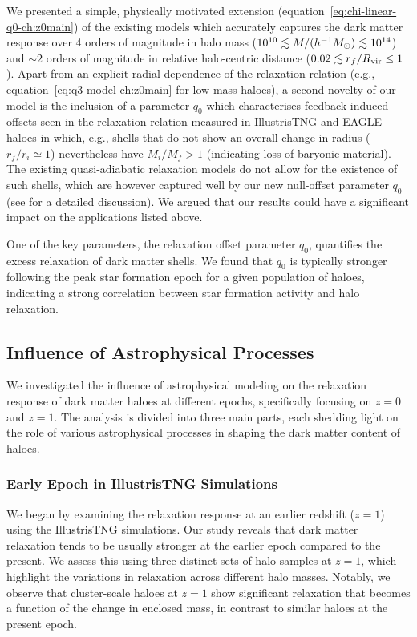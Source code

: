 We presented a simple, physically motivated extension (equation~\ref{eq:chi-linear-q0-ch:z0main}) of the existing models which accurately captures the dark matter response over 4 orders of magnitude in halo mass ($10^{10}\lesssim M/(h^{-1}M_{\odot})\lesssim 10^{14}$) and $\sim2$ orders of magnitude in relative halo-centric distance ($0.02\lesssim r_f/R_{\rm vir}\leq1$). Apart from an explicit radial dependence of the relaxation relation (e.g., equation~\ref{eq:q3-model-ch:z0main} for low-mass haloes), a second novelty of our model is the inclusion of a parameter $q_0$ which characterises feedback-induced offsets seen in the relaxation relation measured in IllustrisTNG and EAGLE haloes in which, e.g., shells that do not show an overall change in radius ($r_f/r_i\simeq1$) nevertheless have $M_i/M_f>1$ (indicating loss of baryonic material). The existing quasi-adiabatic relaxation models do not allow for the existence of such shells, which are however captured well by our new null-offset parameter $q_0$ (see  for a detailed discussion).
We argued that our results could have a significant impact on the applications listed above.

One of the key parameters, the relaxation offset parameter \( q_0 \), quantifies the excess relaxation of dark matter shells. We found that \( q_0 \) is typically stronger following the peak star formation epoch for a given population of haloes, indicating a strong correlation between star formation activity and halo relaxation.

\subsection{Influence of Astrophysical Processes}
We investigated the influence of astrophysical modeling on the relaxation response of dark matter haloes at different epochs, specifically focusing on \( z=0 \) and \( z=1 \). The analysis is divided into three main parts, each shedding light on the role of various astrophysical processes in shaping the dark matter content of haloes.

\subsubsection*{Early Epoch in IllustrisTNG Simulations}
We began by examining the relaxation response at an earlier redshift (\( z=1 \)) using the IllustrisTNG simulations. Our study reveals that dark matter relaxation tends to be usually stronger at the earlier epoch compared to the present. We assess this using three distinct sets of halo samples at \( z=1 \), which highlight the variations in relaxation across different halo masses. Notably, we observe that cluster-scale haloes at \( z=1 \) show significant relaxation that becomes a function of the change in enclosed mass, in contrast to similar haloes at the present epoch.

